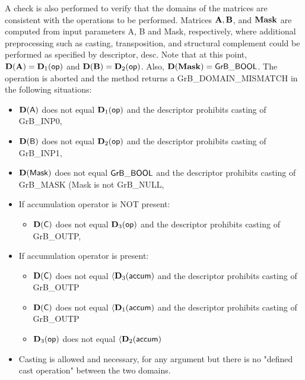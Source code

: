 A check is also performed to verify that the domains of the matrices are consistent
with the operations to be performed.  Matrices ${\bf A}, {\bf B}$, and 
${\bf Mask}$ are computed from input parameters {\sf A}, {\sf B} and {\sf Mask},
respectively, where additional preprocessing such as casting, transposition, and
structural complement could be performed as specified by descriptor, {\sf desc}.
Note that at this point, $\bold{D}({\bf A}) = \bold{D}_1({\sf op})$ and 
$\bold{D}({\bf B}) = \bold{D}_2({\sf op})$.  Also, $\bold{D}({\bf Mask}) = 
{\sf GrB\_BOOL}$.  The operation is aborted and the method returns a {\sf GrB\_DOMAIN\_MISMATCH}
in the following situations:
\begin{itemize}
\item $\bold{D}({\sf A})$ does not equal $\bold{D}_1({\sf op})$ and the descriptor prohibits casting of {\sf GrB\_INP0},
\item $\bold{D}({\sf B})$ does not equal $\bold{D}_2({\sf op})$ and the descriptor prohibits casting of {\sf GrB\_INP1},
\item $\bold{D}({\sf Mask})$ does not equal ${\sf GrB\_BOOL}$ and the descriptor prohibits casting of {\sf GrB\_MASK} (Mask is not {\sf GrB\_NULL},
\item If accumulation operator is NOT present:
        \begin{itemize}
        \item $\bold{D}({\sf C})$ does not equal $\bold{D}_3({\sf op})$ and the descriptor prohibits casting of {\sf GrB\_OUTP},
        \end{itemize}
\item If accumulation operator is present:
        \begin{itemize}
        \item $\bold{D}({\sf C})$ does not equal $\langle \bold{D}_3({\sf accum})$ and the descriptor prohibits casting of {\sf GrB\_OUTP}
        \item $\bold{D}({\sf C})$ does not equal $\langle \bold{D}_1({\sf accum})$ and the descriptor prohibits casting of {\sf GrB\_OUTP}
        \item $\bold{D}_3({\sf op})$ does not equal $\langle \bold{D}_2({\sf accum})$
        \end{itemize}
\item Casting is allowed and necessary, for any argument but there is no "defined cast operation" between the two domains.
\end{itemize}



